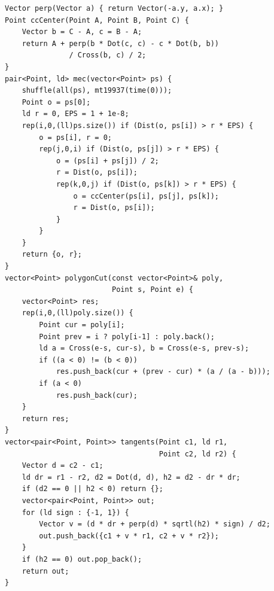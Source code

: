
\begin{lstlisting}
Vector perp(Vector a) { return Vector(-a.y, a.x); }
Point ccCenter(Point A, Point B, Point C) {
    Vector b = C - A, c = B - A;
    return A + perp(b * Dot(c, c) - c * Dot(b, b))
               / Cross(b, c) / 2;
}
pair<Point, ld> mec(vector<Point> ps) {
    shuffle(all(ps), mt19937(time(0)));
    Point o = ps[0];
    ld r = 0, EPS = 1 + 1e-8;
    rep(i,0,(ll)ps.size()) if (Dist(o, ps[i]) > r * EPS) {
        o = ps[i], r = 0;
        rep(j,0,i) if (Dist(o, ps[j]) > r * EPS) {
            o = (ps[i] + ps[j]) / 2;
            r = Dist(o, ps[i]);
            rep(k,0,j) if (Dist(o, ps[k]) > r * EPS) {
                o = ccCenter(ps[i], ps[j], ps[k]);
                r = Dist(o, ps[i]);
            }
        }
    }
    return {o, r};
}
vector<Point> polygonCut(const vector<Point>& poly,
                         Point s, Point e) {
    vector<Point> res;
    rep(i,0,(ll)poly.size()) {
        Point cur = poly[i];
        Point prev = i ? poly[i-1] : poly.back();
        ld a = Cross(e-s, cur-s), b = Cross(e-s, prev-s);
        if ((a < 0) != (b < 0))
            res.push_back(cur + (prev - cur) * (a / (a - b)));
        if (a < 0)
            res.push_back(cur);
    }
    return res;
}
vector<pair<Point, Point>> tangents(Point c1, ld r1,
                                    Point c2, ld r2) {
    Vector d = c2 - c1;
    ld dr = r1 - r2, d2 = Dot(d, d), h2 = d2 - dr * dr;
    if (d2 == 0 || h2 < 0) return {};
    vector<pair<Point, Point>> out;
    for (ld sign : {-1, 1}) {
        Vector v = (d * dr + perp(d) * sqrtl(h2) * sign) / d2;
        out.push_back({c1 + v * r1, c2 + v * r2});
    }
    if (h2 == 0) out.pop_back();
    return out;
}
\end{lstlisting}

